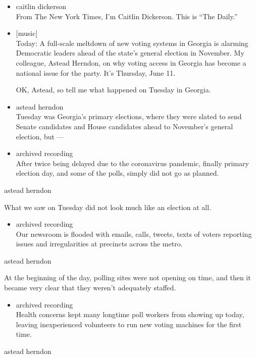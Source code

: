\begin{itemize}
\item
  caitlin dickerson\\
  From The New York Times, I'm Caitlin Dickerson. This is ``The Daily.''
\item
  {[}music{]}\\
  Today: A full-scale meltdown of new voting systems in Georgia is
  alarming Democratic leaders ahead of the state's general election in
  November. My colleague, Astead Herndon, on why voting access in
  Georgia has become a national issue for the party. It's Thursday, June
  11.

  OK, Astead, so tell me what happened on Tuesday in Georgia.
\item
  astead herndon\\
  Tuesday was Georgia's primary elections, where they were slated to
  send Senate candidates and House candidates ahead to November's
  general election, but ---
\item
  archived recording\\
  After twice being delayed due to the coronavirus pandemic, finally
  primary election day, and some of the polls, simply did not go as
  planned.
\end{itemize}

astead herndon

What we saw on Tuesday did not look much like an election at all.

\begin{itemize}
\tightlist
\item
  archived recording\\
  Our newsroom is flooded with emails, calls, tweets, texts of voters
  reporting issues and irregularities at precincts across the metro.
\end{itemize}

astead herndon

At the beginning of the day, polling sites were not opening on time, and
then it became very clear that they weren't adequately staffed.

\begin{itemize}
\tightlist
\item
  archived recording\\
  Health concerns kept many longtime poll workers from showing up today,
  leaving inexperienced volunteers to run new voting machines for the
  first time.
\end{itemize}

astead herndon


